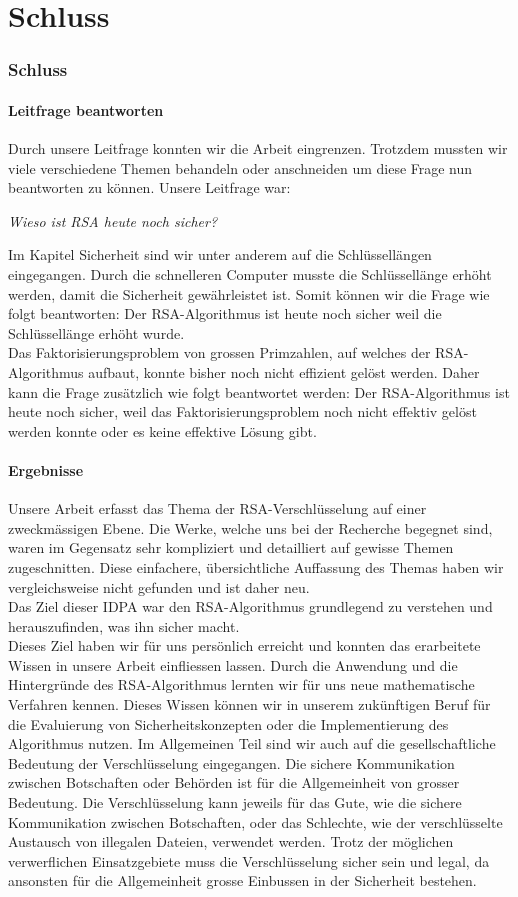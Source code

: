 \part{Schluss}
\section{Schluss}
\subsection{Leitfrage beantworten}
Durch unsere Leitfrage konnten wir die Arbeit eingrenzen. Trotzdem mussten wir viele verschiedene Themen behandeln oder anschneiden um diese Frage nun beantworten zu können. Unsere Leitfrage war:
\begin{center}\textit{Wieso ist RSA heute noch sicher?}\end{center}
Im Kapitel Sicherheit sind wir unter anderem auf die Schlüssellängen eingegangen. Durch die schnelleren Computer musste die Schlüssellänge erhöht werden, damit die Sicherheit gewährleistet ist. Somit können wir die Frage wie folgt beantworten: Der RSA-Algorithmus ist heute noch sicher weil die Schlüssellänge erhöht wurde.\\
Das Faktorisierungsproblem von grossen Primzahlen, auf welches der RSA-Algorithmus aufbaut, konnte bisher noch nicht effizient gelöst werden. Daher kann die Frage zusätzlich wie folgt beantwortet werden: Der RSA-Algorithmus ist heute noch sicher, weil das Faktorisierungsproblem noch nicht effektiv gelöst werden konnte oder es keine effektive Lösung gibt.
%
\subsection{Ergebnisse}
Unsere Arbeit erfasst das Thema der RSA-Verschlüsselung auf einer zweckmässigen Ebene. Die Werke, welche uns bei der Recherche begegnet sind, waren im Gegensatz sehr kompliziert und detailliert auf gewisse Themen zugeschnitten. Diese einfachere, übersichtliche Auffassung des Themas haben wir vergleichsweise nicht gefunden und ist daher neu.\\
Das Ziel dieser IDPA war den RSA-Algorithmus grundlegend zu verstehen und herauszufinden, was ihn sicher macht.\\
Dieses Ziel haben wir für uns persönlich erreicht und konnten das erarbeitete Wissen in unsere Arbeit einfliessen lassen. Durch die Anwendung und die Hintergründe des RSA-Algorithmus lernten wir für uns neue mathematische Verfahren kennen. Dieses Wissen können wir in unserem zukünftigen Beruf für die Evaluierung von Sicherheitskonzepten oder die Implementierung des Algorithmus nutzen. Im Allgemeinen Teil sind wir auch auf die gesellschaftliche Bedeutung der Verschlüsselung eingegangen. Die sichere Kommunikation zwischen Botschaften oder Behörden ist für die Allgemeinheit von grosser Bedeutung. Die Verschlüsselung kann jeweils für das Gute, wie die sichere Kommunikation zwischen Botschaften, oder das Schlechte, wie der verschlüsselte Austausch von illegalen Dateien, verwendet werden. Trotz der möglichen verwerflichen Einsatzgebiete muss die Verschlüsselung sicher sein und legal, da ansonsten für die Allgemeinheit grosse Einbussen in der Sicherheit bestehen. \\
%
